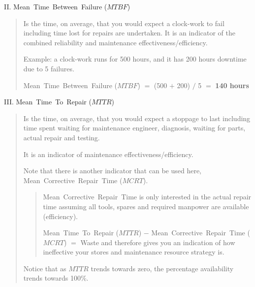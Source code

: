 II. Mean~Time~Between~Failure ($MTBF$) 

\begin{quote}
Is the time, on average, that you would expect a clock-work to fail including time lost for repairs are undertaken. It is an indicator of the combined reliability and maintenance effectiveness/efficiency.

Example: a clock-work runs for 500 hours, and it has 200 hours downtime due to 5 failures.

Mean~Time~Between~Failure ($MTBF$) $=$ (500 $+$ 200) $/$ 5 $=$ \textbf{140 hours}
\end{quote} 

III. Mean~Time~To~Repair ($MTTR$)

\begin{quote}
Is the time, on average, that you would expect a stoppage to last including time spent waiting for maintenance engineer, diagnosis, waiting for parts, actual repair and testing. 

It is an indicator of maintenance effectiveness/efficiency. 

Note that there is another indicator that can be used here, Mean~Corrective~Repair~Time ($MCRT$). 
\begin{quote}
Mean~Corrective~Repair~Time is only interested in the actual repair time assuming all tools, spares and required manpower are available (efficiency).

Mean~Time~To~Repair ($MTTR$) $-$ Mean~Corrective~Repair~Time ($MCRT$)  $=$  Waste and therefore gives you an indication of how ineffective your stores and maintenance resource strategy is.                                                                                                                                                                                                                                                                                                                                                                                                                                                                                                                                                                                                        \end{quote} 

Notice that as $MTTR$ trends towards zero, the percentage availability trends towards 100\%.

\end{quote}

